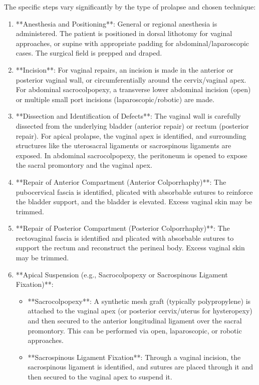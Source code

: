 The specific steps vary significantly by the type of prolapse and chosen technique:

\begin{enumerate}
  \item **Anesthesia and Positioning**: General or regional anesthesia is administered. The patient is positioned in dorsal lithotomy for vaginal approaches, or supine with appropriate padding for abdominal/laparoscopic cases. The surgical field is prepped and draped.
  
  \item **Incision**: For vaginal repairs, an incision is made in the anterior or posterior vaginal wall, or circumferentially around the cervix/vaginal apex. For abdominal sacrocolpopexy, a transverse lower abdominal incision (open) or multiple small port incisions (laparoscopic/robotic) are made.
  
  \item **Dissection and Identification of Defects**: The vaginal wall is carefully dissected from the underlying bladder (anterior repair) or rectum (posterior repair). For apical prolapse, the vaginal apex is identified, and surrounding structures like the uterosacral ligaments or sacrospinous ligaments are exposed. In abdominal sacrocolpopexy, the peritoneum is opened to expose the sacral promontory and the vaginal apex.
  
  \item **Repair of Anterior Compartment (Anterior Colporrhaphy)**: The pubocervical fascia is identified, plicated with absorbable sutures to reinforce the bladder support, and the bladder is elevated. Excess vaginal skin may be trimmed.
  
  \item **Repair of Posterior Compartment (Posterior Colporrhaphy)**: The rectovaginal fascia is identified and plicated with absorbable sutures to support the rectum and reconstruct the perineal body. Excess vaginal skin may be trimmed.
  
  \item **Apical Suspension (e.g., Sacrocolpopexy or Sacrospinous Ligament Fixation)**:
      \begin{itemize}
        \item **Sacrocolpopexy**: A synthetic mesh graft (typically polypropylene) is attached to the vaginal apex (or posterior cervix/uterus for hysteropexy) and then secured to the anterior longitudinal ligament over the sacral promontory. This can be performed via open, laparoscopic, or robotic approaches.
        \item **Sacrospinous Ligament Fixation**: Through a vaginal incision, the sacrospinous ligament is identified, and sutures are placed through it and then secured to the vaginal apex to suspend it.
      \end{itemize}
  

\end{enumerate}
